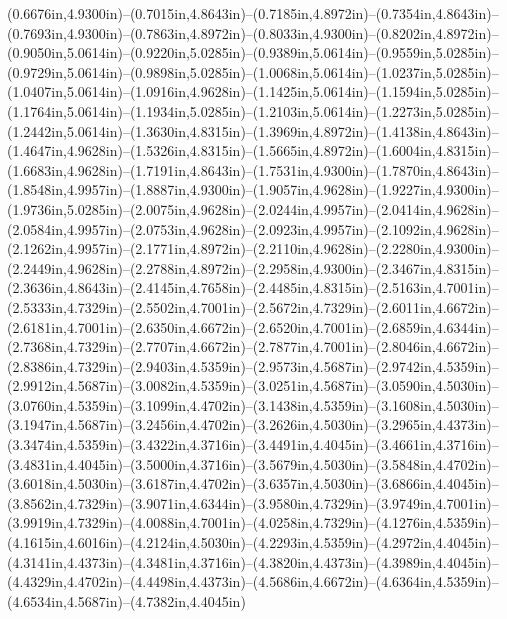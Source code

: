 (0.6676in,4.9300in)--(0.7015in,4.8643in)--(0.7185in,4.8972in)--(0.7354in,4.8643in)--(0.7693in,4.9300in)--(0.7863in,4.8972in)--(0.8033in,4.9300in)--(0.8202in,4.8972in)--(0.9050in,5.0614in)--(0.9220in,5.0285in)--(0.9389in,5.0614in)--(0.9559in,5.0285in)--(0.9729in,5.0614in)--(0.9898in,5.0285in)--(1.0068in,5.0614in)--(1.0237in,5.0285in)--(1.0407in,5.0614in)--(1.0916in,4.9628in)--(1.1425in,5.0614in)--(1.1594in,5.0285in)--(1.1764in,5.0614in)--(1.1934in,5.0285in)--(1.2103in,5.0614in)--(1.2273in,5.0285in)--(1.2442in,5.0614in)--(1.3630in,4.8315in)--(1.3969in,4.8972in)--(1.4138in,4.8643in)--(1.4647in,4.9628in)--(1.5326in,4.8315in)--(1.5665in,4.8972in)--(1.6004in,4.8315in)--(1.6683in,4.9628in)--(1.7191in,4.8643in)--(1.7531in,4.9300in)--(1.7870in,4.8643in)--(1.8548in,4.9957in)--(1.8887in,4.9300in)--(1.9057in,4.9628in)--(1.9227in,4.9300in)--(1.9736in,5.0285in)--(2.0075in,4.9628in)--(2.0244in,4.9957in)--(2.0414in,4.9628in)--(2.0584in,4.9957in)--(2.0753in,4.9628in)--(2.0923in,4.9957in)--(2.1092in,4.9628in)--(2.1262in,4.9957in)--(2.1771in,4.8972in)--(2.2110in,4.9628in)--(2.2280in,4.9300in)--(2.2449in,4.9628in)--(2.2788in,4.8972in)--(2.2958in,4.9300in)--(2.3467in,4.8315in)--(2.3636in,4.8643in)--(2.4145in,4.7658in)--(2.4485in,4.8315in)--(2.5163in,4.7001in)--(2.5333in,4.7329in)--(2.5502in,4.7001in)--(2.5672in,4.7329in)--(2.6011in,4.6672in)--(2.6181in,4.7001in)--(2.6350in,4.6672in)--(2.6520in,4.7001in)--(2.6859in,4.6344in)--(2.7368in,4.7329in)--(2.7707in,4.6672in)--(2.7877in,4.7001in)--(2.8046in,4.6672in)--(2.8386in,4.7329in)--(2.9403in,4.5359in)--(2.9573in,4.5687in)--(2.9742in,4.5359in)--(2.9912in,4.5687in)--(3.0082in,4.5359in)--(3.0251in,4.5687in)--(3.0590in,4.5030in)--(3.0760in,4.5359in)--(3.1099in,4.4702in)--(3.1438in,4.5359in)--(3.1608in,4.5030in)--(3.1947in,4.5687in)--(3.2456in,4.4702in)--(3.2626in,4.5030in)--(3.2965in,4.4373in)--(3.3474in,4.5359in)--(3.4322in,4.3716in)--(3.4491in,4.4045in)--(3.4661in,4.3716in)--(3.4831in,4.4045in)--(3.5000in,4.3716in)--(3.5679in,4.5030in)--(3.5848in,4.4702in)--(3.6018in,4.5030in)--(3.6187in,4.4702in)--(3.6357in,4.5030in)--(3.6866in,4.4045in)--(3.8562in,4.7329in)--(3.9071in,4.6344in)--(3.9580in,4.7329in)--(3.9749in,4.7001in)--(3.9919in,4.7329in)--(4.0088in,4.7001in)--(4.0258in,4.7329in)--(4.1276in,4.5359in)--(4.1615in,4.6016in)--(4.2124in,4.5030in)--(4.2293in,4.5359in)--(4.2972in,4.4045in)--(4.3141in,4.4373in)--(4.3481in,4.3716in)--(4.3820in,4.4373in)--(4.3989in,4.4045in)--(4.4329in,4.4702in)--(4.4498in,4.4373in)--(4.5686in,4.6672in)--(4.6364in,4.5359in)--(4.6534in,4.5687in)--(4.7382in,4.4045in) 